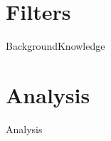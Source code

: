 \documentclass[12pt,a4paper]{article}
\begin{document}
	\tableofcontents
\section{Filters}
	{BackgroundKnowledge}
\section{Analysis}
	{Analysis}
	
	
\end{document}

